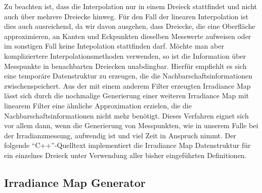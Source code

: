 		Zu beachten ist, dass die Interpolation nur in einem Dreieck stattfindet und nicht auch über mehrere Dreiecke hinweg.
		Für den Fall der linearen Interpolation ist dies auch ausreichend, da wir davon ausgehen, dass Dreiecke, die eine Oberfläche approximieren, an Kanten und Eckpunkten dieselben Messwerte aufweisen oder im sonstigen Fall keine Intepolation stattfinden darf.
		Möchte man aber kompliziertere Interpolationsmethoden verwenden, so ist die Information über Messpunkte in benachbarten Dreiecken unabdingbar.
		Hierfür empfiehlt es sich eine temporäre Datenstruktur zu erzeugen, die die Nachbarschaftsinformationen zwischenspeichert.
		Aus der mit einem anderem Filter erzeugten Irradiance Map lässt sich durch die nochmalige Generierung einer weiteren Irradiance Map mit linearem Filter eine ähnliche Approximation erzielen, die die Nachbarschaftsinformationen nicht mehr benötigt.
		Dieses Verfahren eignet sich vor allem dann, wenn die Generierung von Messpunkten, wie in unserem Falle bei der Irradianzmessung, aufwendig ist und viel Zeit in Anspruch nimmt.
		Der folgende \enquote{C++}-Quelltext implementiert die Irradiance Map Datenstruktur für ein einzelnes Dreieck unter Verwendung aller bisher eingeführten Definitionen.
		


	\subsection{Irradiance Map Generator} %
	\label{sub:irradiance_map_generator}


		





